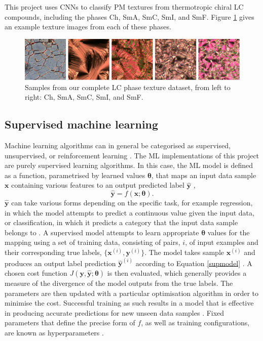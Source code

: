 \documentclass[12pt]{article}
\begin{document}
This project uses CNNs to classify PM textures from thermotropic chiral LC compounds, including the phases Ch, SmA, SmC, SmI, and SmF. Figure \ref{textures} gives an example texture images from each of these phases.
\begin{figure}[!h]
\centering
\includegraphics[width=\textwidth]{images/textures.png}
\caption{Samples from our complete LC phase texture dataset, from left to right: Ch, SmA, SmC, SmI, and SmF.}
\label{textures}
\end{figure}  

\subsection{Supervised machine learning}
Machine learning algorithms can in general be categorised as supervised, unsupervised, or reinforcement learning \cite{Murphy12}. The ML implementations of this project are purely supervised learning algorithms. In this case, the ML model is defined as a function, parametrised by learned values $\bm{\theta}$, that maps an input data sample $\bm{x}$ containing various features to an output predicted label $\hat{\bm{y}}$ \cite{Murphy12},
\begin{equation}
\hat{\bm{y}}=f(\bm{x};\bm{\theta}). \label{supmodel} 
\end{equation}
$\hat{\bm{y}}$ can take various forms depending on the specific task, for example regression, in which the model attempts to predict a continuous value given the input data, or classification, in which it predicts a category that the input data sample belongs to \cite{Murphy12}. A supervised model attempts to learn appropriate $\bm{\theta}$ values for the mapping using a set of training data, consisting of pairs, $i$, of input examples and their corresponding true labels, $\lbrace\bm{x}^{(i)},\bm{y}^{(i)}\rbrace$. The model takes sample $\bm{x}^{(i)}$ and produces an output label prediction $\hat{\bm{y}}^{(i)}$ according to Equation \ref{supmodel} \cite{Murphy12}. A chosen cost function $J(\bm{y},\hat{\bm{y}};\bm{\theta})$ is then evaluated, which generally provides a measure of the divergence of the model outputs from the true labels. The parameters are then updated with a particular optimisation algorithm in order to minimise the cost. Successful training as such results in a model that is effective in producing accurate predictions for new unseen data samples \cite{Murphy12, Goodfellow16}. Fixed parameters that define the precise form of $f$, as well as training configurations, are known as hyperparameters \cite{Murphy12, Goodfellow16}.
\end{document}
